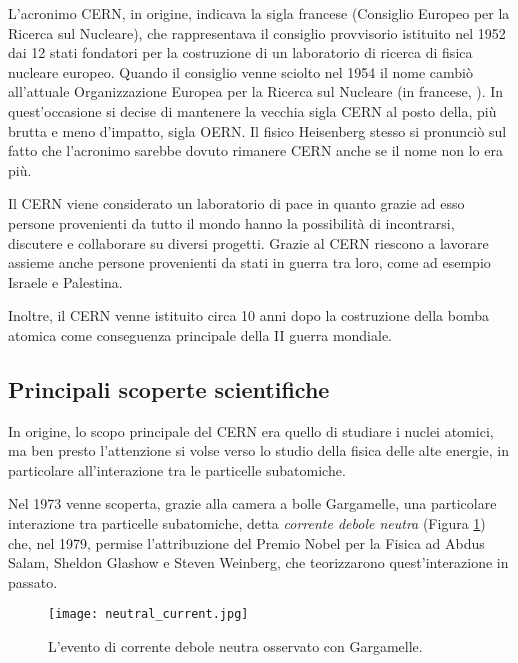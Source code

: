 		L'acronimo \ac{CERN}, in origine, indicava la sigla francese \emph{} (Consiglio Europeo per la Ricerca sul Nucleare), che rappresentava il consiglio provvisorio istituito nel 1952 dai 12 stati fondatori per la costruzione di un laboratorio di ricerca di fisica nucleare europeo. Quando il consiglio venne sciolto nel 1954 il nome cambiò all'attuale Organizzazione Europea per la Ricerca sul Nucleare (in francese, \emph{}). In quest'occasione si decise di mantenere la vecchia sigla \ac{CERN} al posto della, più brutta e meno d'impatto, sigla \ac{OERN}. Il fisico Heisenberg stesso si pronunciò sul fatto che l'acronimo sarebbe dovuto rimanere \ac{CERN} anche se il nome non lo era più.
		
		Il \ac{CERN} viene considerato un laboratorio di pace in quanto grazie ad esso persone provenienti da tutto il mondo hanno la possibilità di incontrarsi, discutere e collaborare su diversi progetti. Grazie al \ac{CERN} riescono a lavorare assieme anche persone provenienti da stati in guerra tra loro, come ad esempio Israele e Palestina.
		
		Inoltre, il \ac{CERN} venne istituito circa 10 anni dopo la costruzione della bomba atomica come conseguenza principale della II guerra mondiale.
		
		\subsection{Principali scoperte scientifiche} \label{subsec:C;s;principali_scoperte_scientifiche}
		
			In origine, lo scopo principale del \ac{CERN} era quello di studiare i nuclei atomici, ma ben presto l'attenzione si volse verso lo studio della fisica delle alte energie, in particolare all'interazione tra le particelle subatomiche.
			
			Nel 1973 venne scoperta, grazie alla camera a bolle Gargamelle, una particolare interazione tra particelle subatomiche, detta \textit{corrente debole neutra} (Figura \ref{fig:corrente_debole_neutra}) che, nel 1979, permise l'attribuzione del Premio Nobel per la Fisica ad Abdus Salam, Sheldon Glashow e Steven Weinberg, che teorizzarono quest'interazione in passato.
			
			\begin{figure}[h!]
				\begin{center}
					\texttt{[image: neutral\_current.jpg]}
				\end{center}
				\caption[Corrente debole neutra]{L'evento di corrente debole neutra osservato con Gargamelle.}
				\label{fig:corrente_debole_neutra}
			\end{figure}
			
